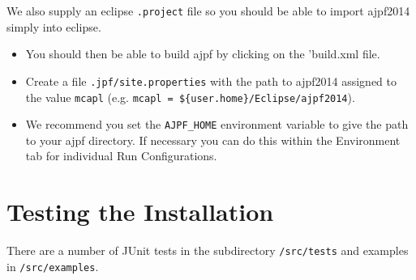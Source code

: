 We also supply an eclipse \texttt{.project} file so you should be able to import ajpf2014 simply into eclipse.
\begin{itemize}
\item You should then be able to build ajpf by clicking on the 'build.xml file.
\item Create a file \texttt{.jpf/site.properties} with the path to ajpf2014 assigned to the value \texttt{mcapl} (e.g. \texttt{mcapl = \$\{user.home\}/Eclipse/ajpf2014}).
\item We recommend you set the \texttt{AJPF\_HOME} environment variable to give the path to your ajpf directory.  If necessary you can do this within the Environment tab for individual Run Configurations.
\end{itemize}

\section{Testing the Installation}

There are a number of JUnit tests in the subdirectory \texttt{/src/tests} and examples in \texttt{/src/examples}.

